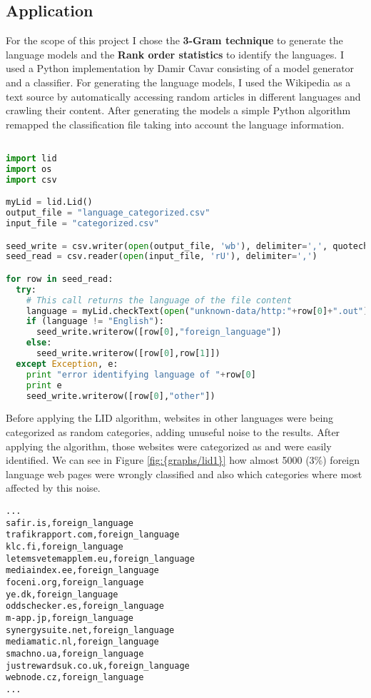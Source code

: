 \subsection{Application}
For the scope of this project I chose the {\bf 3-Gram technique} to generate the language models and the {\bf Rank order statistics} to identify the languages. I used a Python implementation by Damir 
Cavar\cite{lid1} consisting of a model generator and a classifier.
For generating the language models, I used the Wikipedia as a text source by automatically accessing random articles in different languages and crawling their content. 
After generating the models a simple Python algorithm remapped the classification file taking into account the language information.

\begin{lstlisting}[language=Python]

import lid
import os
import csv

myLid = lid.Lid()
output_file = "language_categorized.csv"
input_file = "categorized.csv"

seed_write = csv.writer(open(output_file, 'wb'), delimiter=',', quotechar='|', quoting=csv.QUOTE_MINIMAL)
seed_read = csv.reader(open(input_file, 'rU'), delimiter=',')

for row in seed_read:
  try:
    # This call returns the language of the file content
    language = myLid.checkText(open("unknown-data/http:"+row[0]+".out").read())
    if (language != "English"):
      seed_write.writerow([row[0],"foreign_language"])
    else:
      seed_write.writerow([row[0],row[1]])
  except Exception, e:
    print "error identifying language of "+row[0]
    print e
    seed_write.writerow([row[0],"other"])
\end{lstlisting}

Before applying the LID algorithm, websites in other languages were being categorized as random categories, adding unuseful noise to the results. After applying the algorithm, those websites were 
categorized as  and were easily identified. We can see in Figure \ref{fig:{graphs/lid1}} how almost 5000 (3\%) foreign language web pages were wrongly classified and also which
categories where most affected by this noise.


\begin{lstlisting}
...
safir.is,foreign_language
trafikrapport.com,foreign_language
klc.fi,foreign_language
letemsvetemapplem.eu,foreign_language
mediaindex.ee,foreign_language
foceni.org,foreign_language
ye.dk,foreign_language
oddschecker.es,foreign_language
m-app.jp,foreign_language
synergysuite.net,foreign_language
mediamatic.nl,foreign_language
smachno.ua,foreign_language
justrewardsuk.co.uk,foreign_language
webnode.cz,foreign_language
...
\end{lstlisting}
